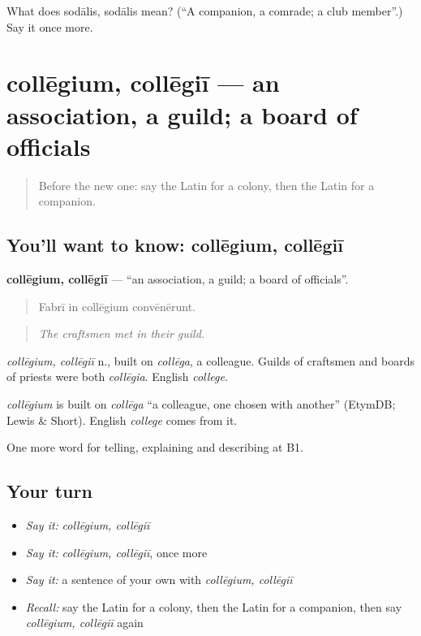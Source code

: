 \begin{tcolorbox}[breakable,colback=teal!4,colframe=teal!35!black,title={Before you move on}]
What does sodālis, sodālis mean? (\textquotedblleft{}A companion, a comrade; a club member\textquotedblright{}.) Say it once more.
\end{tcolorbox}
\section[collēgium, collēgiī]{collēgium, collēgiī — an association, a guild; a board of officials}

\label{lesson:LA-C388-collegium}



\begin{quote}
Before the new one: say the Latin for a colony, then the Latin for a companion.
\end{quote}

\subsection*{You'll want to know: collēgium, collēgiī}
\textbf{collēgium, collēgiī} — \textquotedblleft{}an association, a guild; a board of officials\textquotedblright{}.

\begin{quote}
Fabrī in collēgium convēnērunt.
\end{quote}

\begin{quote}
\emph{The craftsmen met in their guild.}
\end{quote}

\emph{collēgium, collēgiī} n., built on \emph{collēga}, a colleague. Guilds of craftsmen and boards of priests were both \emph{collēgia}. English \emph{college}.

\begin{cousinweb}
\emph{collēgium} is built on \emph{collēga} \textquotedblleft{}a colleague, one chosen with another\textquotedblright{} (EtymDB; Lewis \& Short). English \emph{college} comes from it.
\end{cousinweb}

\begin{grammarlens}[title={What you've built}]
One more word for telling, explaining and describing at B1.
\end{grammarlens}

\subsection*{Your turn}
\begin{itemize}
\raggedright
  \item \emph{Say it:} \emph{collēgium, collēgiī}
  \item \emph{Say it:} \emph{collēgium, collēgiī}, once more
  \item \emph{Say it:} a sentence of your own with \emph{collēgium, collēgiī}
  \item \emph{Recall:} say the Latin for a colony, then the Latin for a companion, then say \emph{collēgium, collēgiī} again
\end{itemize}

